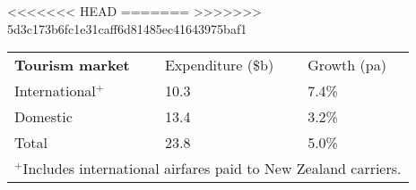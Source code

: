 <<<<<<< HEAD
=======
>>>>>>> 5d3c173b6fc1e31caff6d81485ec41643975baf1
\begin{tabular}[t]{p{4.45cm}>{\hfill}p{1.7cm}>{\hfill}p{1.35cm}}
 \textbf{Tourism market} & Expenditure (\$b) & Growth (pa) \\ 
 International$^+$ & 10.3 & 7.4\% \\ 
  Domestic & 13.4 & 3.2\% \\ 
  Total & 23.8 & 5.0\% \\ 
  \multicolumn{3}{p{7.5cm}}{$^+$Includes international airfares paid to New Zealand carriers.}\ 
\end{tabular}
